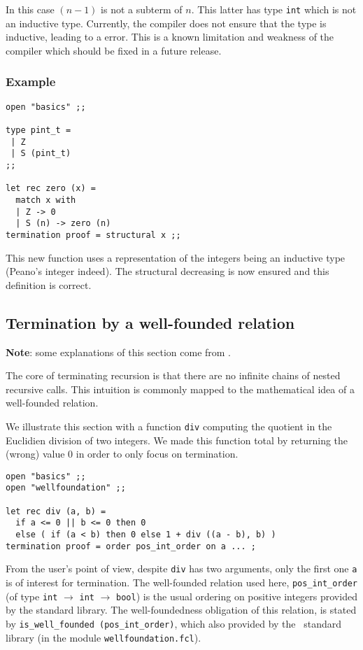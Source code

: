 In this case $(n - 1)$ is not a subterm of $n$. This latter has type
{\tt int} which is not an inductive type. Currently, the compiler does not
ensure that the type is inductive, leading to a {\coq} error. This is a
known limitation and weakness of the compiler which should be fixed in a
future release.

\subsubsection{Example}

\noindent
{\scriptsize
\begin{lstlisting}
open "basics" ;;

type pint_t =
 | Z
 | S (pint_t)
;;

let rec zero (x) =
  match x with
  | Z -> 0
  | S (n) -> zero (n)
termination proof = structural x ;;
\end{lstlisting}
}

This new function uses a representation of the integers being an inductive
type (Peano's integer indeed). The structural decreasing is now ensured and
this definition is correct.


\subsection{Termination by a well-founded relation}
{\bf Note}: some explanations of this section come from
\cite{Dubois-Pessaux-termproofs}.

\medskip
The core of terminating recursion is that there are no infinite
chains of nested recursive calls. This intuition is commonly mapped to
the mathematical idea of a well-founded relation.

\medskip
We illustrate this section with a function {\tt div} computing the quotient
in the Euclidien division of two integers. We made this function total by
returning the (wrong) value 0 in order to only focus on termination.

\noindent
{\scriptsize
\begin{lstlisting}
open "basics" ;;
open "wellfoundation" ;;

let rec div (a, b) =
  if a <= 0 || b <= 0 then 0
  else ( if (a < b) then 0 else 1 + div ((a - b), b) )
termination proof = order pos_int_order on a ... ;
\end{lstlisting}
}

From the user's point of view, despite {\tt div} has two arguments,
only the first one {\tt a} is of interest for termination. The
well-founded relation used here, {\tt pos\_int\_order}
(of type {\tt int} $\rightarrow$ {\tt int}  $\rightarrow$ {\tt bool}) is the
usual ordering on positive integers provided by the standard library.
The well-foundedness obligation of this relation, is stated by
\lstinline"is_well_founded (pos_int_order)", which also provided by the
\focal\ standard library (in the module {\tt wellfoundation.fcl}).

